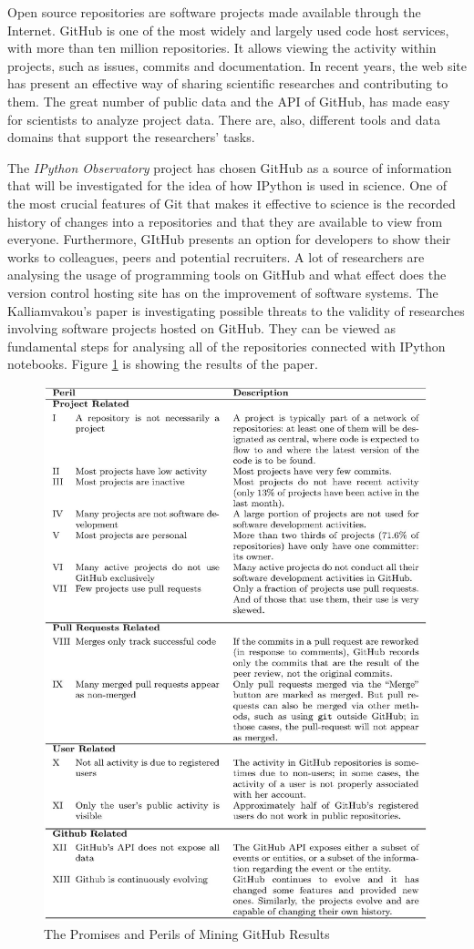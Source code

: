 
Open source repositories are software projects made available through the Internet.\cite{ossWiki}
GitHub is one of the most widely and largely used code host services, with more than ten million repositories.\cite{gitHubWiki}\cite{kalliamvakoupromises} It allows viewing the activity within projects, such as issues, commits and documentation. In recent years, the web site has present an effective way of sharing scientific researches and contributing to them. The great number of public data and the API of GitHub, has made easy for scientists to analyze project data. There are, also, different tools and data domains that support the researchers' tasks.\cite{gandrud2013github}

The \textit{IPython Observatory} project has chosen GitHub as a source of information that will be investigated for the idea of how IPython is used in science. One of the most crucial features of Git that makes it effective to science is the recorded history of changes into a repositories and that they are available to view from everyone. \cite{ram2013git} Furthermore, GItHub presents an option for developers to show their works to colleagues, peers and potential recruiters. A lot of researchers are analysing the usage of programming tools on GitHub and what effect does the version control hosting site has on the improvement of software systems. The Kalliamvakou's paper \cite{kalliamvakoupromises} is investigating possible threats to the validity of researches involving software projects hosted on GitHub. They can be viewed as fundamental steps for analysing all of the repositories connected with IPython notebooks. Figure \ref{fig:github} is showing the results of the paper. 

\begin{figure}
\centering
\includegraphics[scale=1.0]{images/file-page1}
\caption{The Promises and Perils of Mining GitHub Results}
\label{fig:github}
\end{figure}
